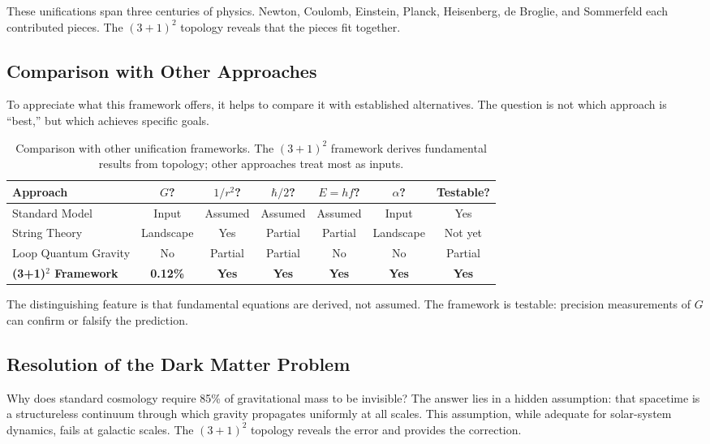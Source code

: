 \documentclass[aps,prd,preprint,superscriptaddress,showpacs,preprintnumbers,amsmath,amssymb,nofootinbib]{revtex4-2}
\begin{document}
These unifications span three centuries of physics. Newton, Coulomb, Einstein, Planck, Heisenberg, de Broglie, and Sommerfeld each contributed pieces. The $(3+1)^2$ topology reveals that the pieces fit together.

\subsection{Comparison with Other Approaches}
\label{subsec:comparison}

To appreciate what this framework offers, it helps to compare it with established alternatives. The question is not which approach is ``best,'' but which achieves specific goals.

\begin{table}[H]
\centering
\begin{tabular*}{\textwidth}{@{\extracolsep{\fill}} lcccccc @{}}
\toprule
\textbf{Approach} & \textbf{$G$?} & \textbf{$1/r^2$?} & \textbf{$\hbar/2$?} & \textbf{$E = hf$?} & \textbf{$\alpha$?} & \textbf{Testable?} \\
\midrule
Standard Model & Input & Assumed & Assumed & Assumed & Input & Yes \\
String Theory & Landscape & Yes & Partial & Partial & Landscape & Not yet \\
Loop Quantum Gravity & No & Partial & Partial & No & No & Partial \\
\textbf{(3+1)$^2$ Framework} & \textbf{0.12\%} & \textbf{Yes} & \textbf{Yes} & \textbf{Yes} & \textbf{Yes} & \textbf{Yes} \\
\bottomrule
\end{tabular*}
\caption{Comparison with other unification frameworks. The $(3+1)^2$ framework derives fundamental results from topology; other approaches treat most as inputs.}
\label{tab:comparison}
\end{table}

The distinguishing feature is that fundamental equations are derived, not assumed. The framework is testable: precision measurements of $G$ can confirm or falsify the prediction.

\subsection{Resolution of the Dark Matter Problem}
\label{subsec:darkmatter}

Why does standard cosmology require 85\% of gravitational mass to be invisible? The answer lies in a hidden assumption: that spacetime is a structureless continuum through which gravity propagates uniformly at all scales. This assumption, while adequate for solar-system dynamics, fails at galactic scales. The $(3+1)^2$ topology reveals the error and provides the correction.
\end{document}
